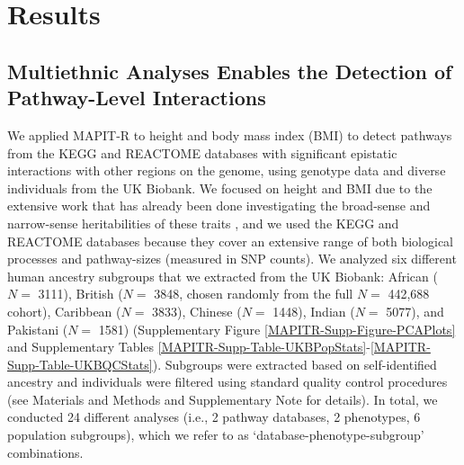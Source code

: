 \documentclass[10pt]{article}
\begin{document}

\section*{Results}\label{MAPITR-Results}

\subsection*{Multiethnic Analyses Enables the Detection of Pathway-Level Interactions}\label{MAPITR-Results-PathwayEpistasis}

We applied MAPIT-R to height and body mass index (BMI) to detect pathways from the KEGG and REACTOME databases \cite{Liberzon2011} with significant epistatic interactions with other regions on the genome, using genotype data and diverse individuals from the UK Biobank. We focused on height and BMI due to the extensive work that has already been done investigating the broad-sense and narrow-sense heritabilities of these traits \cite{Yang2010,Elks2012,Visscher2012,Finucane2015,Speed2017,Wainschtein2019}, and we used the KEGG and REACTOME databases because they cover an extensive range of both biological processes and pathway-sizes (measured in SNP counts). We analyzed six different human ancestry subgroups that we extracted from the UK Biobank: African ($N=$ 3111), British ($N=$ 3848, chosen randomly from the full $N=$ 442,688 cohort), Caribbean ($N=$ 3833), Chinese ($N=$ 1448), Indian ($N=$ 5077), and Pakistani ($N=$ 1581) (Supplementary Figure \ref{MAPITR-Supp-Figure-PCAPlots} and Supplementary Tables \ref{MAPITR-Supp-Table-UKBPopStats}-\ref{MAPITR-Supp-Table-UKBQCStats}). Subgroups were extracted based on self-identified ancestry and individuals were filtered using standard quality control procedures (see Materials and Methods and Supplementary Note for details). In total, we conducted 24 different analyses (i.e., 2 pathway databases, 2 phenotypes, 6 population subgroups), which we refer to as `database-phenotype-subgroup' combinations.
\end{document}
